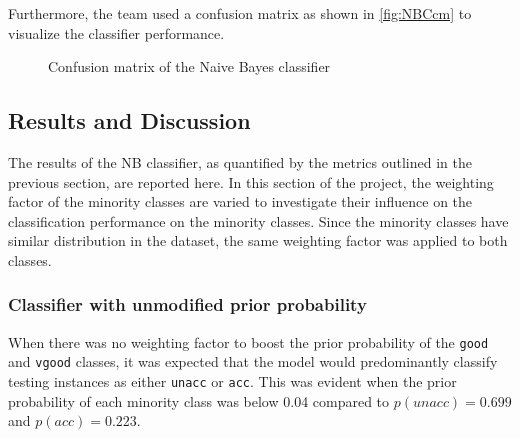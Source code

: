 \documentclass[a4paper]{article}
\begin{document}
Furthermore, the team used a confusion matrix as shown in \autoref{fig:NBCcm} to visualize the classifier performance.

\begin{figure} [h]
  \caption{Confusion matrix of the Naive Bayes classifier} 
  \label{fig:NBCcm}
\end{figure}


\subsection{Results and Discussion}
The results of the NB classifier, as quantified by the metrics outlined in the previous section, are reported here. In this section of the project, the weighting factor of the minority classes are varied to investigate their influence on the classification performance on the minority classes. Since the minority classes have similar distribution in the dataset, the same weighting factor was applied to both classes.

\subsubsection{Classifier with unmodified prior probability}
When there was no weighting factor to boost the prior probability of the \lstinline{good} and \lstinline{vgood} classes, it was expected that the model would predominantly classify testing instances as either \lstinline{unacc} or \lstinline{acc}. This was evident when the prior probability of each minority class was below 0.04 compared to $p(unacc)=0.699$ and $p(acc)=0.223$. 
\end{document}
